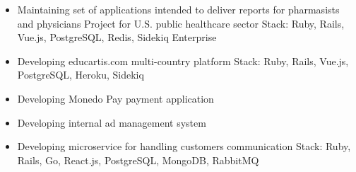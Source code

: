 \documentclass[10pt,a4paper,ragged2e]{altacv}
\begin{document}

\begin{fullwidth}
\makecvheader
\end{fullwidth}



\begin{itemize}
\item Maintaining set of applications intended to deliver reports for pharmasists and physicians \newline
Project for U.S. public healthcare sector \newline
{\small Stack: Ruby, Rails, Vue.js, PostgreSQL, Redis, Sidekiq Enterprise}
\end{itemize}

\divider

\begin{itemize}
\item Developing educartis.com multi-country platform \newline
{\small Stack: Ruby, Rails, Vue.js, PostgreSQL, Heroku, Sidekiq}
\end{itemize}

\divider

\begin{itemize}
\item Developing Monedo Pay payment application
\item Developing internal ad management system
\item Developing microservice for handling customers communication \newline
{\small Stack: Ruby, Rails, Go, React.js, PostgreSQL, MongoDB, RabbitMQ}
\end{itemize}
\end{document}
